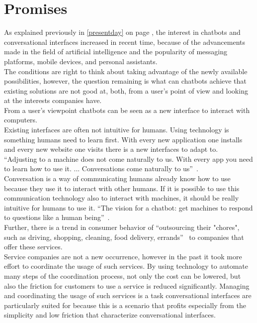 \section{Promises}


As explained previously in \ref{presentday} on page \pageref{presentday}, the interest in chatbots and conversational interfaces increased in recent time, because of the advancements made in the field of artificial intelligence and the popularity of messaging platforms, mobile devices, and personal assistants.
\\
The conditions are right to think about taking advantage of the newly available possibilities, however, the question remaining is what can chatbots achieve that existing solutions are not good at, both, from a user's point of view and looking at the interests companies have.
\\

From a user's viewpoint chatbots can be seen as a new interface to interact with computers.
\\
Existing interfaces are often not intuitive for humans.
Using technology is something humans need to learn first.
With every new application one installs and every new website one visits there is a new interfaces to adapt to.
\\
``Adjusting to a machine does not come naturally to us. With every app you need to learn how to use it. ... Conversations come naturally to us''~\cite{techinasia}.
\\
Conversation is a way of communicating humans already know how to use because they use it to interact with other humans.
If it is possible to use this communication technology also to interact with machines, it should be really intuitive for humans to use it.
``The vision for a chatbot: get machines to respond to questions like a human being''~\cite{techinasia}.
\\

Further, there is a trend in consumer behavior of ``outsourcing their "chores", such as driving, shopping, cleaning, food delivery, errands''~\cite{chatbotbook} to companies that offer these services.
\\
Service companies are not a new occurrence, however in the past it took more effort to coordinate the usage of such services.
By using technology to automate many steps of the coordination process, not only the cost can be lowered,
but also the friction for customers to use a service is reduced significantly.
Managing and coordinating the usage of such services is a task conversational interfaces are particularly suited for because this is a scenario that profits especially from the simplicity and low friction that characterize conversational interfaces.
\\

